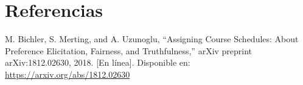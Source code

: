 \documentclass{article}
\begin{document}


\section{Referencias}
\renewcommand{\refname}{}

\begin{thebibliography}{9}

   \label{ref:BPS} M. Bichler, S. Merting, and A. Uzunoglu,
  “Assigning Course Schedules: About Preference Elicitation, Fairness, and Truthfulness,”
  arXiv preprint arXiv:1812.02630, 2018. [En línea]. Disponible en:
  \url{https://arxiv.org/abs/1812.02630}


\end{thebibliography}
\end{document}
